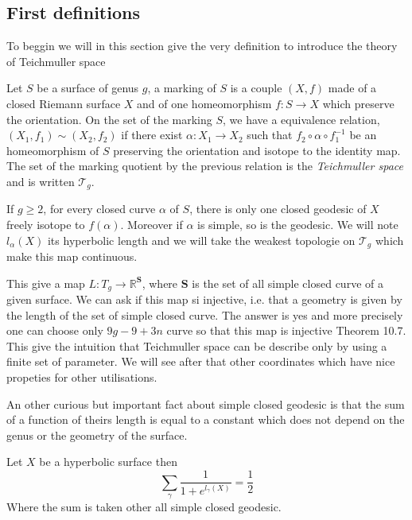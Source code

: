 \subsection{First definitions}

To beggin we will in this section give the very definition to introduce the theory of Teichmuller space

\begin{dfnt}
Let $S$ be a surface of genus $g$, a marking of $S$ is a couple $(X,f)$ made of a closed Riemann surface $X$ and of one homeomorphism $f:S \to X$ which preserve the orientation.
On the set of the marking $S$, we have a equivalence relation,  $(X_1,f_1) \sim (X_2,f_2)$ if there exist $\alpha : X_1 \to X_2 $ such that $f_2 \circ \alpha \circ f_1^{-1}$ be an homeomorphism of $S$ preserving the orientation and isotope to the identity map.%
The set of the marking quotient by the previous relation is the \emph{Teichmuller space} and is written $\mathcal{T}_g$.
\end{dfnt}

\begin{rmq}
If $g \geq 2$, for every closed curve $\alpha$ of $S$, there is only one closed geodesic of $X$ freely isotope to $f(\alpha)$. Moreover if $\alpha$ is simple, so is the geodesic. We will note $l_{\alpha}(X)$ its hyperbolic length and we will take the weakest topologie on $\mathcal{T}_g$ which make this map continuous.
\end{rmq}

This give a map $L: T_g \to \mathbb{R}^{\mathbf{S}}$, where $\mathbf{S}$ is the set of all simple closed curve of a given surface. We can ask if this map si injective, i.e. that a geometry is given by the length of the set of simple closed curve. The answer is yes and more precisely one can choose only $9g-9+3n$ curve so that this map is injective \cite{farb2011primer} Theorem 10.7.  This give the intuition that Teichmuller space can be describe only by using a finite set of parameter. We will see after that other coordinates which have nice propeties for other utilisations.


An other curious but important fact about simple closed geodesic is that the sum of a function of theirs length is equal to a constant which does not depend on the genus or the geometry of the surface.

\begin{thm}
Let $X$ be a hyperbolic surface then \[
\sum_{\gamma} \frac{1}{1+e^{l_{\gamma}(X)}}=\frac{1}{2}
\]
Where the sum is taken other all simple closed geodesic.
\end{thm}

